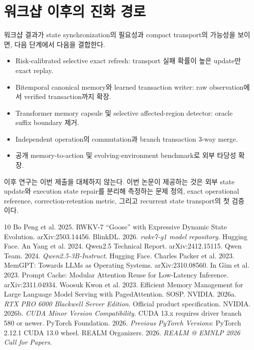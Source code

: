 \documentclass[10.5pt,a4paper]{article}
\begin{document}
\section{워크샵 이후의 진화 경로}

워크샵 결과가 state synchronization의 필요성과 compact transport의 가능성을 보이면, 다음 단계에서 다음을 결합한다.

\begin{itemize}
\item Risk-calibrated selective exact refresh: transport 실패 확률이 높은 update만 exact replay.
\item Bitemporal canonical memory와 learned transaction writer: raw observation에서 verified transaction까지 확장.
\item Transformer memory capsule 및 selective affected-region detector: oracle suffix boundary 제거.
\item Independent operation의 commutation과 branch transaction 3-way merge.
\item 공개 memory-to-action 및 evolving-environment benchmark로 외부 타당성 확장.
\end{itemize}

이후 연구는 이번 제출을 대체하지 않는다. 이번 논문이 제공하는 것은 외부 state update와 execution state repair를 분리해 측정하는 문제 정의, exact operational reference, correction-retention metric, 그리고 recurrent state transport의 첫 검증이다.

\begin{thebibliography}{10}
 Bo Peng et al. 2025. RWKV-7 ``Goose'' with Expressive Dynamic State Evolution. arXiv:2503.14456.
 BlinkDL. 2026. \emph{rwkv7-g1 model repository}. Hugging Face.
 An Yang et al. 2024. Qwen2.5 Technical Report. arXiv:2412.15115.
 Qwen Team. 2024. \emph{Qwen2.5-3B-Instruct}. Hugging Face.
 Charles Packer et al. 2023. MemGPT: Towards LLMs as Operating Systems. arXiv:2310.08560.
 In Gim et al. 2023. Prompt Cache: Modular Attention Reuse for Low-Latency Inference. arXiv:2311.04934.
 Woosuk Kwon et al. 2023. Efficient Memory Management for Large Language Model Serving with PagedAttention. SOSP.
 NVIDIA. 2026a. \emph{RTX PRO 6000 Blackwell Server Edition}. Official product specification.
 NVIDIA. 2026b. \emph{CUDA Minor Version Compatibility}. CUDA 13.x requires driver branch 580 or newer.
 PyTorch Foundation. 2026. \emph{Previous PyTorch Versions}: PyTorch 2.12.1 CUDA 13.0 wheel.
 REALM Organizers. 2026. \emph{REALM @ EMNLP 2026 Call for Papers}.
\end{thebibliography}
\end{document}
